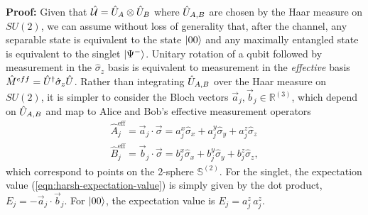 \vspace{3mm}
\noindent\textbf{Proof:}
Given that $\hat{\mathcal{U}} = \hat{U}_A \otimes \hat{U}_B$ where $\hat{U}_{A,B}$ are chosen by the Haar measure on $SU(2)$, we can assume without loss of generality that, after the channel, any separable state is equivalent to the state $\mbox{$ | 00 \rangle $}$ and any maximally entangled state is equivalent to the singlet $\mbox{$ | \Psi^- \rangle $}$. Unitary rotation of a qubit followed by measurement in the $\hat{\sigma}_z$ basis is equivalent to measurement in the \emph{effective} basis $\hat{M}^{eff} = \hat{U}^\dagger \hat{\sigma}_z \hat{U}$. Rather than integrating $\hat{U}_{A,B}$ over the Haar measure on $SU(2)$, it is simpler to consider the Bloch vectors $\vec{a}_j, \vec{b}_j \in \mathbb{R}^{(3)}$, which depend on $\hat{U}_{A,B}$ and map to Alice and Bob's effective measurement operators 
\begin{align}
\hat{A}_j^\text{eff} = \vec{a}_j \cdot \vec{\sigma} = a_j^x \hat{\sigma}_x + a_j^y \hat{\sigma}_y + a_j^z \hat{\sigma}_z\\
\hat{B}_j^\text{eff} = \vec{b}_j \cdot \vec{\sigma} = b_j^x \hat{\sigma}_x + b_j^y \hat{\sigma}_y + b_j^z \hat{\sigma}_z,
\end{align}
which correspond to points on the 2-sphere $\mathbb{S}^{(2)}$. For the singlet, the expectation value (\ref{eqn:harsh-expectation-value}) is simply given by the dot product, $E_j=-\vec{a}_j \cdot \vec{b}_j$. For $\mbox{$ | 00 \rangle $}$, the expectation value is $E_j = a_j^z\, a_j^z$.



